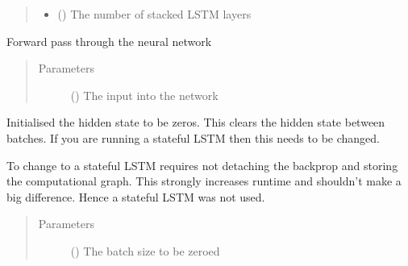 \documentclass[letterpaper,10pt,english]{sphinxmanual}
\begin{document}
\begin{fulllineitems}
\begin{quote}
\begin{description}
\begin{itemize}
\item {} 
 () \textendash{} The number of stacked LSTM layers

\end{itemize}

\end{description}\end{quote}

\begin{fulllineitems}
\label{\detokenize{models:Foresight.models.LSTM.forward}}
Forward pass through the neural network
\begin{quote}\begin{description}
\item[{Parameters}] \leavevmode
{} () \textendash{} The input into the network

\end{description}\end{quote}

\end{fulllineitems}


\begin{fulllineitems}
\label{\detokenize{models:Foresight.models.LSTM.init_hidden}}
Initialised the hidden state to be zeros. This clears the hidden
state between batches. If you are running a stateful LSTM then this
needs to be changed.

To change to a stateful LSTM requires not detaching the backprop and
storing the computational graph. This strongly increases runtime and
shouldn’t make a big difference. Hence a stateful LSTM was not used.
\begin{quote}\begin{description}
\item[{Parameters}] \leavevmode
{} () \textendash{} The batch size to be zeroed

\end{description}\end{quote}

\end{fulllineitems}


\end{fulllineitems}
\end{document}
